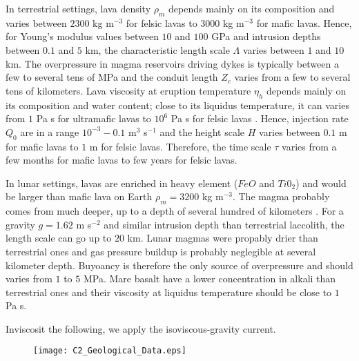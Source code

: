 In terrestrial settings,  lava density $\rho_m$ depends  mainly on its
composition and varies between $ 2300$ kg m$^{-3}$ for felsic lavas to
$3000$ kg m$^{-3}$ for mafic  lavas. Hence, for Young's modulus values
between $10$ and $100$ GPa and  intrusion depths between $0.1$ and $5$
km, the characteristic  length scale $\Lambda$ varies  between $1$ and
$10$  km.   The overpressure  in  magma  reservoirs driving  dykes  is
typically    between    a    few    to    several    tens    of    MPa
\citep{Tait:1988vn,Marti:2000fe} and  the conduit length  $Z_c$ varies
from a few  to several tens of kilometers. Lava  viscosity at eruption
temperature  $\eta_h$  depends mainly  on  its  composition and  water
content; close to its liquidus temperature,  it can varies from $1$ Pa
s  for   ultramafic  lavas   to  $10^{6}$  Pa   s  for   felsic  lavas
\citep{Anonymous:CZVBrBvv,Giordano:2008em,Whittington:2009fv,Chevrel:2013jn}.
Hence,  injection  rate  $Q_0$  are in  a  range  $10^{-3}-0.1$  m$^3$
s$^{-1}$ and  the height scale  $H$ varies  between $0.1$ m  for mafic
lavas to  $1$ m for  felsic lavas.   Therefore, the time  scale $\tau$
varies  from a  few months  for mafic  lavas to  few years  for felsic
lavas.

In  lunar settings,  lavas are  enriched in  heavy element  ($FeO$ and
$Ti0_2$) and would be larger than mafic lava on Earth $\rho_m=3200$ kg
m$^{-3}$. The magma probably comes from  much deeper, up to a depth of
several hundred  of kilometers  \citep{Shearer:2006gg}. For  a gravity
$g=1.62$  m  s$^{-2}$ and  similar  intrusion  depth than  terrestrial
laccolith, the  length scale can go  up to $20$ km.  Lunar magmas were
propably  drier than  terrestrial  ones and  gas  pressure buildup  is
probably neglegible at several kilometer depth.  Buyoancy is therefore
the only  source of  overpressure and  should varies  from $1$  to $5$
MPa. Mare basalt have a lower concentration in alkali than terrestrial
ones and  their viscosity at  liquidus temperature should be  close to
$1$ Pa s. 




Inviscosit the following, we apply the isoviscous-gravity current.
\begin{figure}
  \begin{center}
    \graphicspath{ {/Users/teihorey/Documents/These/Manuscript/Figure/Chapter2/} }
    \texttt{[image: C2\_Geological\_Data.eps]}
    \caption{}
    \label{C2_Geological_Data}
  \end{center}
\end{figure}


